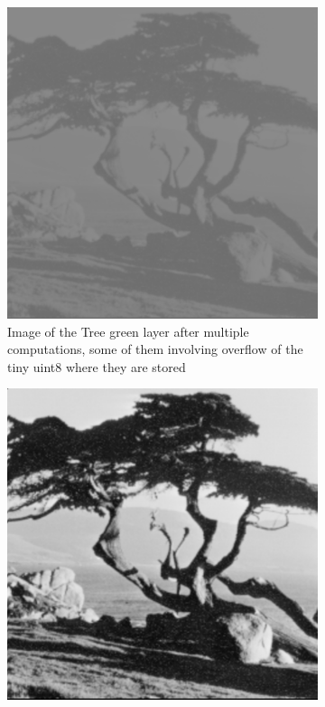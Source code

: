 \documentclass[a4paper,11pt]{article}
\begin{document}
\begin{figure}[h!]
  \begin{center}
    \begin{subfigure}[t]{0.3\textwidth}
      \centering
      \includegraphics[width=0.9\linewidth]{Images/ps0-4-b.png}
      \caption{Image of the Tree green layer after multiple computations, some of them involving overflow of the tiny uint8 where they are stored}
      \label{q4b}
    \end{subfigure}
    \begin{subfigure}[t]{0.3\textwidth}
      \centering
      \includegraphics[width=0.9\linewidth]{Images/ps0-4-c.png}

\end{subfigure}
\end{center}
\end{figure}
\end{document}

